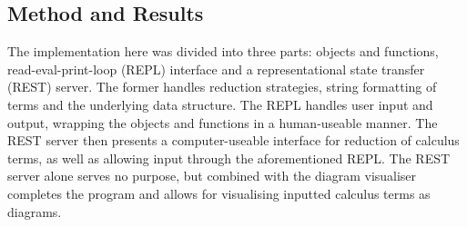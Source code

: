 \subsection{Method and Results}
    The implementation here was divided into three parts: objects and functions, read-eval-print-loop (REPL) interface and a representational state transfer (REST) server.
    The former handles reduction strategies, string formatting of terms and the underlying data structure.
    The REPL handles user input and output, wrapping the objects and functions in a human-useable manner.
    The REST server then presents a computer-useable interface for reduction of calculus terms, as well as allowing input through the aforementioned REPL.
    The REST server alone serves no purpose, but combined with the diagram visualiser completes the program and allows for visualising inputted calculus terms as diagrams.
